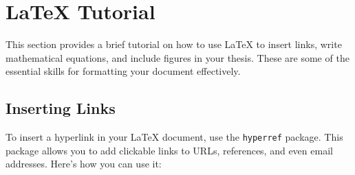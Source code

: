 \chapter{LaTeX Tutorial}

This section provides a brief tutorial on how to use LaTeX to insert links, write mathematical equations, and include figures in your thesis. These are some of the essential skills for formatting your document effectively.

\section{Inserting Links}
To insert a hyperlink in your LaTeX document, use the \texttt{hyperref} package. This package allows you to add clickable links to URLs, references, and even email addresses. Here’s how you can use it:

